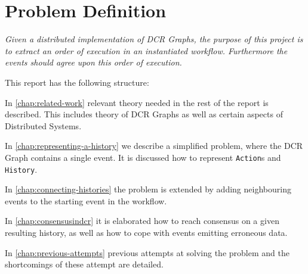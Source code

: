 \section{Problem Definition} %
	\textit{Given a distributed implementation of DCR Graphs, the purpose of this project is to extract an order of execution in an instantiated workflow. Furthermore the events should agree upon this order of execution.}
	
	\vspace{0.6cm}
	
	\newpar
	This report has the following structure:
	
	\newpar
	In \autoref{chap:related-work} relevant theory needed in the rest of the report is described. This includes theory of DCR Graphs as well as certain aspects of Distributed Systems. 
	
	\newpar
	In \autoref{chap:representing-a-history} we describe a simplified problem, where the DCR Graph contains a single event. It is discussed how to represent \texttt{Action}s and \texttt{History}. 
	
	\newpar
	In \autoref{chap:connecting-histories} the problem is extended by adding neighbouring events to the starting event in the workflow. 
	
	\newpar
	In \autoref{chap:consensusindcr} it is elaborated how to reach consensus on a given resulting history, as well as how to cope with events emitting erroneous data.
	
	\newpar
	In \autoref{chap:previous-attempts} previous attempts at solving the problem and the shortcomings of these attempt are detailed. 
		
	
